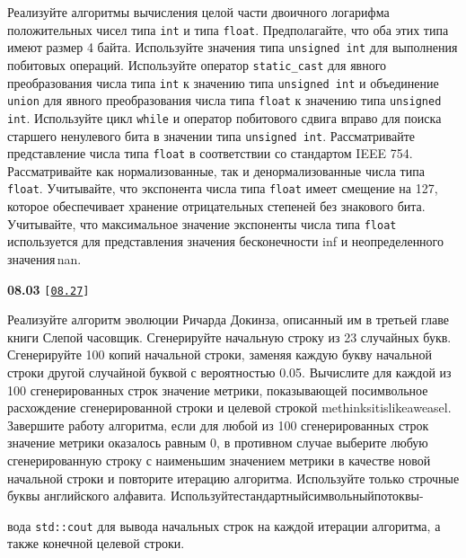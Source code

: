 \documentclass[a4paper,12pt]{article}
\begin{document}
Реализуйте алгоритмы вычисления целой части двоичного логарифма положительных чисел типа \lstinline{int} и типа \lstinline{float}. Предполагайте, что оба этих типа имеют размер 4 байта. Используйте значения типа \lstinline{unsigned int} для выполнения побитовых операций. Используйте оператор \lstinline{static_cast} для явного преобразования числа типа \lstinline{int} к значению типа \lstinline{unsigned int} и объединение \lstinline{union} для явного преобразования числа типа \lstinline{float} к значению типа \lstinline{unsigned int}. Используйте цикл \lstinline{while} и оператор побитового сдвига вправо для поиска старшего ненулевого бита в значении типа \lstinline{unsigned int}. Рассматривайте представление числа типа \lstinline{float} в соответствии со стандартом IEEE 754. Рассматривайте как нормализованные, так и денормализованные числа типа \lstinline{float}. Учитывайте, что экспонента числа типа \lstinline{float} имеет смещение на 127, которое обеспечивает хранение отрицательных степеней без знакового бита. Учитывайте, что максимальное значение экспоненты числа типа \lstinline{float} используется для представления значения бесконечности inf и неопределенного значения\,nan.

\bigskip

{\large \textbf{08.03} \texttt{[\href{https://github.com/i-s-m-mipt/Education/blob/master/projects/examples/source/08.27.cpp}{\texttt{08.27}}]}}

\bigskip

Реализуйте алгоритм эволюции Ричарда Докинза, описанный им в третьей главе книги Слепой часовщик. Сгенерируйте начальную строку из 23 случайных букв. Сгенерируйте 100 копий начальной строки, заменяя каждую букву начальной строки другой случайной буквой с вероятностью 0.05. Вычислите для каждой из 100 сгенерированных строк значение метрики, показывающей посимвольное расхождение сгенерированной строки и целевой строкой methinksitislikeaweasel. Завершите работу алгоритма, если для любой из 100 сгенерированных строк значение метрики оказалось равным 0, в противном случае выберите любую сгенерированную строку с наименьшим значением метрики в качестве новой начальной строки и повторите итерацию алгоритма. Используйте только строчные буквы английского алфавита. Используйте\;стандартный\;символьный\;поток\;вы- 

вода \lstinline{std::cout} для вывода начальных строк на каждой итерации алгоритма, а также конечной целевой строки.
\end{document}
